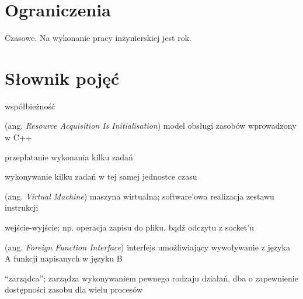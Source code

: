 \documentclass[11pt,oneside,a4paper,titlepage,onecolumn]{article}
\begin{document}
\section{Ograniczenia}

Czasowe. Na wykonanie pracy inżynierskiej jest rok.

\section{Słownik pojęć}

\begin{labeling}{współbieżność}
\item [RAII] (ang. \emph{Resource Acquisition Is Initialisation}) model obsługi zasobów wprowadzony w C++
\item [współbieżność] przeplatanie wykonania kilku zadań
\item [równoległość] wykonywanie kilku zadań w tej samej jednostce czasu
\item [VM] (ang. \emph{Virtual Machine}) maszyna wirtualna; software'owa realizacja zestawu instrukcji
\item [I/O] wejście-wyjście; np. operacja zapisu do pliku, bądź odczytu z socket'u
\item [FFI] (ang. \emph{Foreign Function Interface}) interfejs umożliwiający wywoływanie z języka A funkcji
    napisanych w języku B
\item [scheduler] ``zarządca''; zarządza wykonywaniem pewnego rodzaju działań, dba o zapewnienie dostępności
    zasobu dla wielu procesów
\end{labeling}
\end{document}
